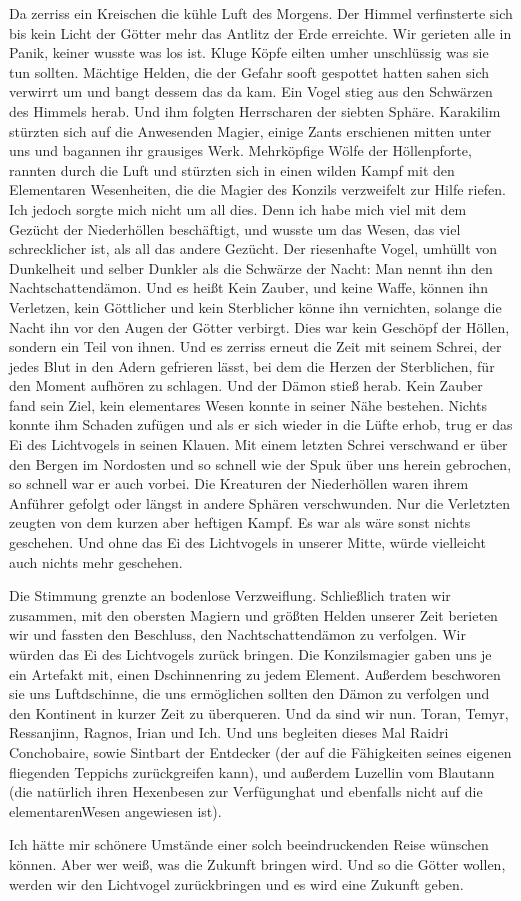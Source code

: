 Da zerriss ein Kreischen die kühle Luft des Morgens. Der Himmel verfinsterte sich bis kein Licht der Götter mehr das Antlitz der Erde erreichte. Wir gerieten alle in Panik, keiner wusste was los ist. Kluge Köpfe eilten umher unschlüssig was sie tun sollten. Mächtige Helden, die der Gefahr sooft gespottet hatten sahen sich verwirrt um und bangt dessem das da kam. Ein Vogel stieg aus den Schwärzen des Himmels herab. Und ihm folgten Herrscharen der siebten Sphäre. Karakilim stürzten sich auf die Anwesenden Magier, einige Zants erschienen mitten unter uns und bagannen ihr grausiges Werk. Mehrköpfige Wölfe der Höllenpforte, rannten durch die Luft und stürzten sich in einen wilden Kampf mit den Elementaren Wesenheiten, die die Magier des Konzils verzweifelt zur Hilfe riefen. Ich jedoch sorgte mich nicht um all dies. Denn ich habe mich viel mit dem Gezücht der Niederhöllen beschäftigt, und wusste um das Wesen, das viel schrecklicher ist, als all das andere Gezücht. Der riesenhafte Vogel, umhüllt von Dunkelheit und selber Dunkler als die Schwärze der Nacht: Man nennt ihn den Nachtschattendämon. Und es heißt Kein Zauber, und keine Waffe, können ihn Verletzen, kein Göttlicher und kein Sterblicher könne ihn vernichten, solange die Nacht ihn vor den Augen der Götter verbirgt. Dies war kein Geschöpf der Höllen, sondern ein Teil von ihnen. Und es zerriss erneut die Zeit mit seinem Schrei, der jedes Blut in den Adern gefrieren lässt, bei dem die Herzen der Sterblichen, für den Moment aufhören zu schlagen. Und der Dämon stieß herab. Kein Zauber fand sein Ziel, kein elementares Wesen konnte in seiner Nähe bestehen. Nichts konnte ihm Schaden zufügen und als er sich wieder in die Lüfte erhob, trug er das Ei des Lichtvogels in seinen Klauen. Mit einem letzten Schrei verschwand er über den Bergen im Nordosten und so schnell wie der Spuk über uns herein gebrochen, so schnell war er auch vorbei. Die Kreaturen der Niederhöllen waren ihrem Anführer gefolgt oder längst in andere Sphären verschwunden. Nur die Verletzten zeugten von dem kurzen aber heftigen Kampf. Es war als wäre sonst nichts geschehen. Und ohne das Ei des Lichtvogels in unserer Mitte, würde vielleicht auch nichts mehr geschehen.

Die Stimmung grenzte an bodenlose Verzweiflung. Schließlich traten wir zusammen, mit den obersten Magiern und größten Helden unserer Zeit berieten wir und fassten den Beschluss, den Nachtschattendämon zu verfolgen. Wir würden das Ei des Lichtvogels zurück bringen. Die Konzilsmagier gaben uns je ein Artefakt mit, einen Dschinnenring zu jedem Element. Außerdem beschworen sie uns Luftdschinne, die uns ermöglichen sollten den Dämon zu verfolgen und den Kontinent in kurzer Zeit zu überqueren. Und da sind wir nun. Toran, Temyr, Ressanjinn, Ragnos, Irian und Ich. Und uns begleiten dieses Mal Raidri Conchobaire, sowie Sintbart der Entdecker (der auf die Fähigkeiten seines eigenen fliegenden Teppichs zurückgreifen kann), und außerdem Luzellin vom Blautann (die natürlich ihren Hexenbesen zur Verfügunghat und ebenfalls nicht auf die elementarenWesen angewiesen ist).

Ich hätte mir schönere Umstände einer solch beeindruckenden Reise wünschen können. Aber wer weiß, was die Zukunft bringen wird. Und so die Götter wollen, werden wir den Lichtvogel zurückbringen und es wird eine Zukunft geben.


